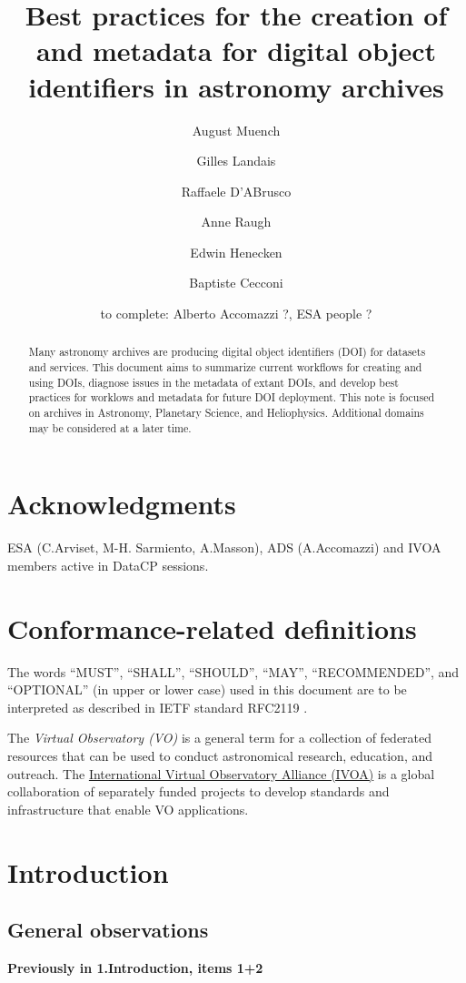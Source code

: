 \documentclass[11pt,a4paper]{ivoa}
\title{Best practices for the creation of and metadata for digital object identifiers in astronomy archives}
\author[https://orcid.org/0000-0003-0666-6367]{August Muench}
\author[https://orcid.org/0000-0003-4868-5873]{Gilles Landais}
\author[https://orcid.org/0000-0003-3073-0605]{Raffaele D'ABrusco}
\author[https://orcid.org/0000-0002-8300-9443]{Anne Raugh}
\author[]{Edwin Henecken}
\author[https://orcid.org/0000-0001-7915-5571]{Baptiste Cecconi}
\author[]{to complete: Alberto Accomazzi ?, ESA people ?}
\begin{document}

\begin{abstract}
Many astronomy archives are producing digital object identifiers (DOI) for datasets and services.
This document aims to summarize current workflows for creating and using DOIs, 
diagnose issues in the metadata of extant DOIs, 
and develop best practices for worklows and metadata for future DOI deployment.
This note is focused on archives in Astronomy, Planetary Science, and Heliophysics. 
Additional domains may be considered at a later time.
\end{abstract}


\section*{Acknowledgments}

ESA (C.Arviset, M-H. Sarmiento, A.Masson), ADS (A.Accomazzi) and IVOA members active in DataCP sessions.

\section*{Conformance-related definitions}

The words ``MUST'', ``SHALL'', ``SHOULD'', ``MAY'', ``RECOMMENDED'', and
``OPTIONAL'' (in upper or lower case) used in this document are to be
interpreted as described in IETF standard RFC2119 \citep{std:RFC2119}.

The \emph{Virtual Observatory (VO)} is a general term for a collection of federated resources that can be used to conduct astronomical research, education, and outreach.
The \href{https://www.ivoa.net}{International Virtual Observatory Alliance (IVOA)} is a global collaboration of separately funded projects to develop standards and infrastructure that enable VO applications.


\section{Introduction}
\label{sec:intro}


\subsection{General observations} 
\textbf{\color{red} Previously in 1.Introduction, items 1+2}
\end{document}

